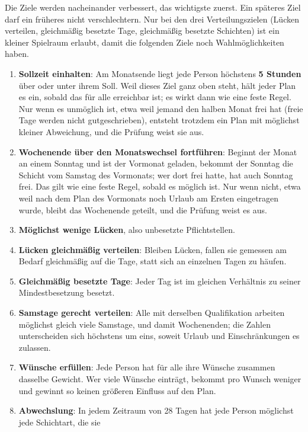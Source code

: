 \documentclass[11pt]{combiArticle}
\begin{document}
Die Ziele werden nacheinander verbessert, das wichtigste zuerst. Ein späteres Ziel darf ein früheres nicht
verschlechtern. Nur bei den drei Verteilungszielen (Lücken verteilen, gleichmäßig besetzte Tage, gleichmäßig
besetzte Schichten) ist ein kleiner Spielraum erlaubt, damit die folgenden Ziele noch Wahlmöglichkeiten haben.
\begin{enumerate}
  \item \textbf{Sollzeit einhalten}: Am Monatsende liegt jede Person höchstens \textbf{5 Stunden} über oder unter
        ihrem Soll. Weil dieses Ziel ganz oben steht, hält jeder Plan es ein, sobald das für alle erreichbar ist;
        es wirkt dann wie eine feste Regel. Nur wenn es unmöglich ist, etwa weil jemand den halben Monat frei
        hat (freie Tage werden nicht gutgeschrieben), entsteht trotzdem ein Plan mit möglichst kleiner Abweichung, und die Prüfung weist sie aus.
  \item \textbf{Wochenende über den Monatswechsel fortführen}: Beginnt der Monat an einem Sonntag und ist der
        Vormonat geladen, bekommt der Sonntag die Schicht vom Samstag des Vormonats; wer dort frei hatte, hat auch
        Sonntag frei. Das gilt wie eine feste Regel, sobald es möglich ist. Nur wenn nicht, etwa weil nach dem Plan
        des Vormonats noch Urlaub am Ersten eingetragen wurde, bleibt das Wochenende geteilt, und die Prüfung weist es
        aus.
  \item \textbf{Möglichst wenige Lücken}, also unbesetzte Pflichtstellen.
  \item \textbf{Lücken gleichmäßig verteilen}: Bleiben Lücken, fallen sie gemessen am Bedarf gleichmäßig auf die
        Tage, statt sich an einzelnen Tagen zu häufen.
  \item \textbf{Gleichmäßig besetzte Tage}: Jeder Tag ist im gleichen Verhältnis zu seiner Mindestbesetzung besetzt.
  \item \textbf{Samstage gerecht verteilen}: Alle mit derselben Qualifikation arbeiten möglichst gleich viele
        Samstage, und damit Wochenenden; die Zahlen unterscheiden sich höchstens um eins, soweit Urlaub und
        Einschränkungen es zulassen.
  \item \textbf{Wünsche erfüllen}: Jede Person hat für alle ihre Wünsche zusammen dasselbe Gewicht. Wer viele
        Wünsche einträgt, bekommt pro Wunsch weniger und gewinnt so keinen größeren Einfluss auf den Plan.
  \item \textbf{Abwechslung}: In jedem Zeitraum von 28 Tagen hat jede Person möglichst jede Schichtart, die sie

\end{enumerate}
\end{document}
